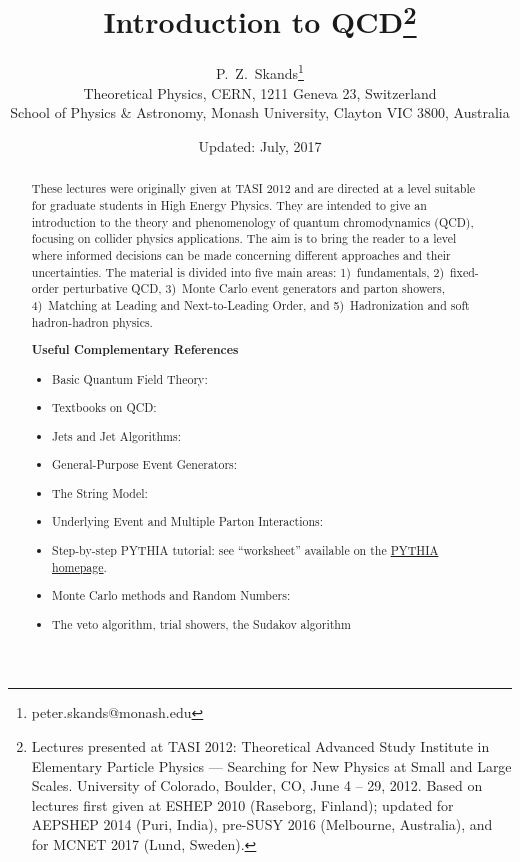 \documentclass[11pt,letterpaper,twopage,pdf]{article}
\begin{document}
\title{Introduction to QCD\thanks
                 {Lectures presented at TASI 2012: Theoretical Advanced
 Study Institute in Elementary Particle Physics  --- Searching for
 New Physics at Small and Large Scales. University of Colorado, Boulder,
 CO, June 4 -- 29, 2012. Based on lectures first given at ESHEP 2010
 (Raseborg, Finland); updated for AEPSHEP 2014 (Puri, India), 
 pre-SUSY 2016 (Melbourne, Australia), and for MCNET 2017 (Lund, Sweden).}}
\author{P.~Z.~Skands\thanks
                 {peter.skands@monash.edu}\\[4mm]
 Theoretical Physics, CERN, 1211 Geneva 23, Switzerland\\
 School of Physics \& Astronomy, Monash University, Clayton VIC 3800, Australia\\}
\date{Updated: July, 2017}
\maketitle
\begin{abstract}
These lectures were originally given at TASI 2012 and 
are directed at a level suitable for 
graduate students in High Energy
Physics. They are intended to give an introduction to 
the theory and phenomenology of quantum  chromodynamics (QCD),
focusing on collider physics applications. The aim is to bring the
reader to a level where informed decisions can be made 
concerning different approaches and their uncertainties. 
The material is divided into five main
areas:  1)~fundamentals, 2)~fixed-order perturbative QCD, 
3)~Monte Carlo event generators and parton showers, 4)~Matching at
Leading and Next-to-Leading Order, and 5)~Hadronization and soft
hadron-hadron physics.
\vspace*{1cm}
\begin{center}
{\bf Useful Complementary References}\\[2mm]
\begin{itemize}
\item Basic Quantum Field Theory: \cite{Peskin:1995ev}
\item Textbooks on QCD: \cite{Field:1989uq,Ellis:1991qj,Dissertori:2003pj}
\item Jets and Jet Algorithms: \cite{Salam:2010zt}
\item General-Purpose Event Generators: \cite{Buckley:2011ms}
\item The String Model: \cite{Andersson:1983ia,Andersson:1998tv}
\item Underlying Event and Multiple Parton Interactions: \cite{Sjostrand:1987su,Sjostrand:2017cdm}
\item Step-by-step PYTHIA tutorial: see ``worksheet'' available on the \href{http://home.thep.lu.se/Pythia/}{PYTHIA homepage}.
\item Monte Carlo methods and Random Numbers:
  \cite{James:1980yn,Weinzierl:2000wd}
\item The veto algorithm, trial showers, the Sudakov algorithm~\cite{Platzer:2011dq,Lonnblad:2012hz,Mrenna:2016sih}
\end{itemize}
\end{center}
\end{abstract}
\end{document}
